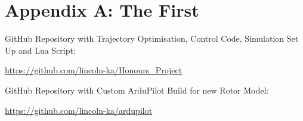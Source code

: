 \chapter{Appendix A: The First}

GitHub Repository with Trajectory Optimisation, Control Code, Simulation Set Up and Lua Script:

\url{https://github.com/lincoln-ka/Honours_Project}



GitHub Repository with Custom ArduPilot Build for new Rotor Model:

\url{https://github.com/lincoln-ka/ardupilot}